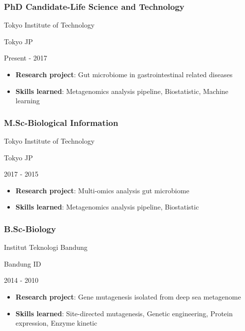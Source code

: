 \documentclass[]{article}
\providecommand{\tightlist}{%
  \setlength{\itemsep}{0pt}\setlength{\parskip}{0pt}}
\begin{document}
\hypertarget{phd-candidate-life-science-and-technology}{%
\subsubsection{PhD Candidate-Life Science and
Technology}\label{phd-candidate-life-science-and-technology}}

Tokyo Institute of Technology

Tokyo JP

Present - 2017

\begin{itemize}
\tightlist
\item
  \textbf{Research project}: Gut microbiome in gastrointestinal related
  diseases
\item
  \textbf{Skills learned}: Metagenomics analysis pipeline, Biostatistic,
  Machine learning
\end{itemize}

\hypertarget{m.sc-biological-information}{%
\subsubsection{M.Sc-Biological
Information}\label{m.sc-biological-information}}

Tokyo Institute of Technology

Tokyo JP

2017 - 2015

\begin{itemize}
\tightlist
\item
  \textbf{Research project}: Multi-omics analysis gut microbiome
\item
  \textbf{Skills learned}: Metagenomics analysis pipeline, Biostatistic
\end{itemize}

\hypertarget{b.sc-biology}{%
\subsubsection{B.Sc-Biology}\label{b.sc-biology}}

Institut Teknologi Bandung

Bandung ID

2014 - 2010

\begin{itemize}
\tightlist
\item
  \textbf{Research project}: Gene mutagenesis isolated from deep sea
  metagenome
\item
  \textbf{Skills learned}: Site-directed mutagenesis, Genetic
  engineering, Protein expression, Enzyme kinetic
\end{itemize}
\end{document}

